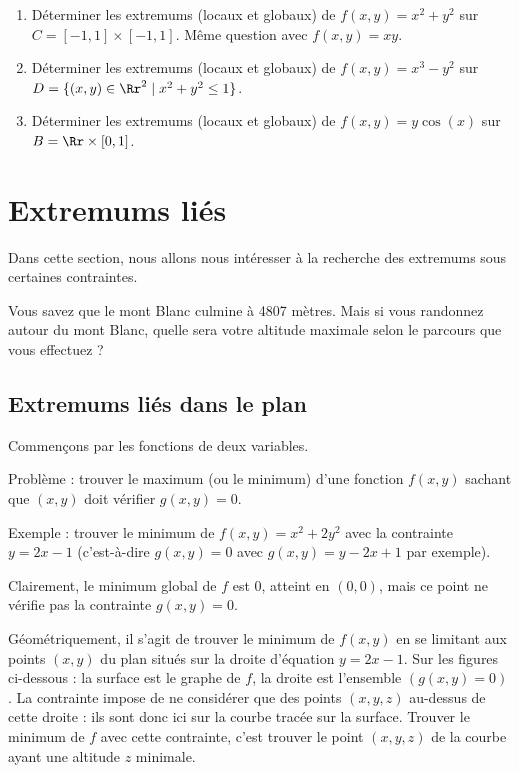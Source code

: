 \documentclass[11pt, class=report,crop=false]{standalone}
\begin{document}
\begin{miniexercices}
    \sauteligne
    \begin{enumerate}
        \item Déterminer les extremums (locaux et globaux) de $f(x,y) = x^2+y^2$ sur $C = [-1,1] \times [-1,1]$. Même question avec $f(x,y)= xy$.

        \item Déterminer les extremums (locaux et globaux) de $f(x,y) = x^3-y^2$ sur $D = \lbrace (x,y) \in \Rr^2  \mid  x^2 + y^2 \leq 1 \rbrace$.

        \item Déterminer les extremums (locaux et globaux) de $f(x,y) = y\cos(x)$ sur $B = \Rr \times [0,1]$.
    \end{enumerate}
\end{miniexercices}



\section{Extremums liés}

Dans cette section, nous allons nous intéresser à la recherche des extremums sous certaines contraintes.

Vous savez que le mont Blanc culmine à 4807 mètres. Mais si vous randonnez autour du mont Blanc, quelle sera votre altitude maximale selon le parcours que vous effectuez ?

\subsection{Extremums liés dans le plan}

Commençons par les fonctions de deux variables. 

Problème : trouver le maximum (ou le minimum) d'une fonction $f(x,y)$ sachant que $(x,y)$ doit vérifier $g(x,y)=0$.

Exemple : trouver le minimum de $f(x,y) = x^2 + 2y^2$ avec la contrainte $y = 2x-1$ (c'est-à-dire $g(x,y)=0$ avec $g(x,y)=y-2x+1$ par exemple).

Clairement, le minimum global de $f$ est $0$, atteint en $(0,0)$, mais ce point ne vérifie pas la contrainte $g(x,y)=0$.

Géométriquement, il s'agit de trouver le minimum de $f(x,y)$ en se limitant aux points $(x,y)$ du plan situés sur la droite d'équation $y=2x-1$.
Sur les figures ci-dessous : la surface est le graphe de $f$, la droite est l'ensemble $(g(x,y)=0)$. La contrainte impose de ne considérer que des points $(x,y,z)$ au-dessus de cette droite : ils sont donc ici sur la courbe tracée sur la surface.
Trouver le minimum de $f$ avec cette contrainte, c'est trouver le point $(x,y,z)$ de la courbe ayant une altitude $z$ minimale. 
\end{document}
